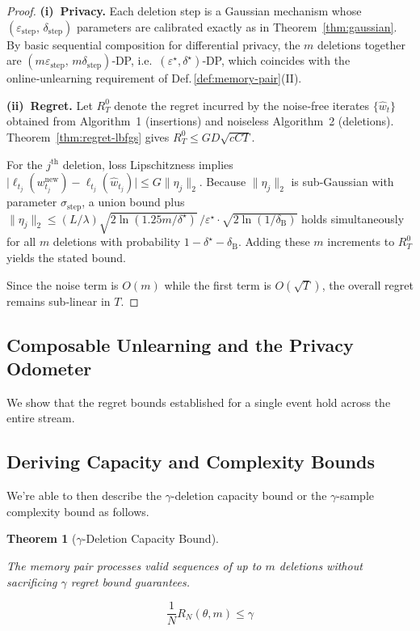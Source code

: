 \documentclass[a4paper,12pt]{article}
\newtheorem{theorem}{Theorem}[section]
\begin{document}
\begin{proof}
\textbf{(i) Privacy.}
Each deletion step is a Gaussian mechanism whose $(\varepsilon_{\text{step}},\,
\delta_{\text{step}})$ parameters are calibrated exactly as in
Theorem~\ref{thm:gaussian}.  
By basic sequential composition for differential privacy,
the $m$ deletions together are
$(m\varepsilon_{\text{step}},\,m\delta_{\text{step}})$‑DP, i.e.\
$(\varepsilon^\star,\delta^\star)$‑DP, which coincides with the
online‑unlearning requirement of Def.\,\ref{def:memory-pair}(II).

\medskip
\noindent
\textbf{(ii) Regret.}
Let $R_{T}^{0}$ denote the regret incurred by the noise‑free iterates
$\{\hat w_{t}\}$ obtained from Algorithm 1 (insertions) and noiseless
Algorithm 2 (deletions).
Theorem~\ref{thm:regret-lbfgs} gives
$R_{T}^{0} \le GD\sqrt{cCT}$.

For the $j^{\text{th}}$ deletion, loss Lipschitzness implies  
$\bigl|\ell_{t_j}(w_{t_j}^{\text{new}})-\ell_{t_j}(\hat w_{t_j})\bigr|
      \le G\lVert\eta_j\rVert_2$.
Because $\lVert\eta_j\rVert_2$ is sub‑Gaussian with parameter
$\sigma_{\text{step}}$, a union bound plus
$\|\eta_j\|_2 \le
  (L/\lambda)\sqrt{2\ln(1.25m/\delta^{\star})}\,/\varepsilon^{\star}
  \cdot\sqrt{2\ln(1/\delta_{\mathrm{B}})}$
holds simultaneously for all $m$ deletions
with probability $1-\delta^\star-\delta_{\mathrm{B}}$.
Adding these $m$ increments to $R_{T}^{0}$ yields the stated bound.

Since the noise term is $O(m)$ while the first term is
$O(\sqrt{T})$, the overall regret remains sub‑linear in $T$.
\end{proof}
\subsection{Composable Unlearning and the Privacy Odometer}

We show that the regret bounds established for a single event hold across the entire stream.

\subsection{Deriving Capacity and Complexity Bounds}

We're able to then describe the $\gamma$-deletion capacity bound or the $\gamma$-sample complexity bound as follows.

\begin{theorem} [$\gamma$-Deletion Capacity Bound]
\label{thm:gamma-capacity}

The memory pair processes valid sequences of up to $m$ deletions without sacrificing $\gamma$ regret bound guarantees.

$$
\frac{1}{N}R_{N}(\theta,m) \leq \gamma
$$

\end{theorem}
\end{document}
